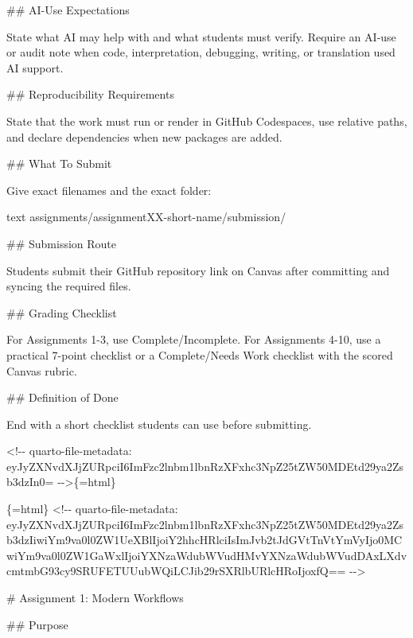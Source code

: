 \documentclass[
  letterpaper,
  DIV=11,
  numbers=noendperiod,
  oneside]{scrreprt}
\newenvironment{Shaded}{\begin{snugshade}}{\end{snugshade}}
\newcommand{\FunctionTok}[1]{\textcolor[rgb]{0.28,0.35,0.67}{#1}}
\newcommand{\InformationTok}[1]{\textcolor[rgb]{0.37,0.37,0.37}{#1}}
\newcommand{\NormalTok}[1]{\textcolor[rgb]{0.00,0.23,0.31}{#1}}
\begin{document}
\begin{Shaded}
\begin{Highlighting}[numbers=left,,]
\FunctionTok{\#\# AI{-}Use Expectations}

\NormalTok{State what AI may help with and what students must verify. Require an AI{-}use or audit note when code, interpretation, debugging, writing, or translation used AI support.}

\FunctionTok{\#\# Reproducibility Requirements}

\NormalTok{State that the work must run or render in GitHub Codespaces, use relative paths, and declare dependencies when new packages are added.}

\FunctionTok{\#\# What To Submit}

\NormalTok{Give exact filenames and the exact folder:}

\InformationTok{\textasciigrave{}\textasciigrave{}\textasciigrave{}text}
\InformationTok{assignments/assignmentXX{-}short{-}name/submission/}
\InformationTok{\textasciigrave{}\textasciigrave{}\textasciigrave{}}

\FunctionTok{\#\# Submission Route}

\NormalTok{Students submit their GitHub repository link on Canvas after committing and syncing the required files.}

\FunctionTok{\#\# Grading Checklist}

\NormalTok{For Assignments 1{-}3, use Complete/Incomplete. For Assignments 4{-}10, use a practical 7{-}point checklist or a Complete/Needs Work checklist with the scored Canvas rubric.}

\FunctionTok{\#\# Definition of Done}

\NormalTok{End with a short checklist students can use before submitting.}


\InformationTok{\textasciigrave{}\textless{}!{-}{-} quarto{-}file{-}metadata: eyJyZXNvdXJjZURpciI6ImFzc2lnbm1lbnRzXFxhc3NpZ25tZW50MDEtd29ya2Zsb3dzIn0= {-}{-}\textgreater{}\textasciigrave{}}\NormalTok{\{=html\}}

\InformationTok{\textasciigrave{}\textasciigrave{}\textasciigrave{}\{=html\}}
\InformationTok{\textless{}!{-}{-} quarto{-}file{-}metadata: eyJyZXNvdXJjZURpciI6ImFzc2lnbm1lbnRzXFxhc3NpZ25tZW50MDEtd29ya2Zsb3dzIiwiYm9va0l0ZW1UeXBlIjoiY2hhcHRlciIsImJvb2tJdGVtTnVtYmVyIjo0MCwiYm9va0l0ZW1GaWxlIjoiYXNzaWdubWVudHMvYXNzaWdubWVudDAxLXdvcmtmbG93cy9SRUFETUUubWQiLCJib29rSXRlbURlcHRoIjoxfQ== {-}{-}\textgreater{}}
\InformationTok{\textasciigrave{}\textasciigrave{}\textasciigrave{}}

\FunctionTok{\# Assignment 1: Modern Workflows }


\FunctionTok{\#\# Purpose}


\end{Highlighting}
\end{Shaded}
\end{document}
